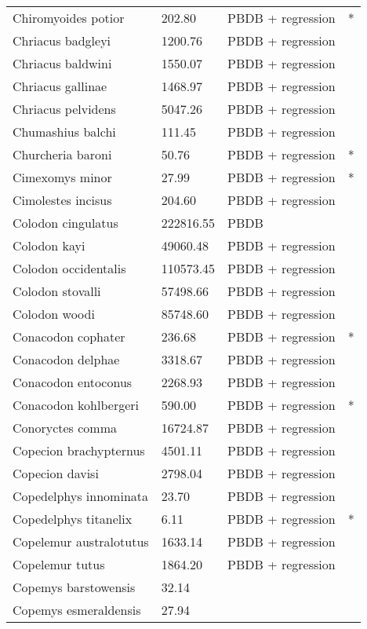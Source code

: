 \documentclass{article}
\begin{document}
\begin{center}
\begin{longtable}{p{} p{} p{} p{}}
    Chiromyoides potior & 202.80 & PBDB + regression & * \\ 
    Chriacus badgleyi & 1200.76 & PBDB + regression &  \\ 
    Chriacus baldwini & 1550.07 & PBDB + regression &  \\ 
    Chriacus gallinae & 1468.97 & PBDB + regression &  \\ 
    Chriacus pelvidens & 5047.26 & PBDB + regression &  \\ 
    Chumashius balchi & 111.45 & PBDB + regression &  \\ 
    Churcheria baroni & 50.76 & PBDB + regression & * \\ 
    Cimexomys minor & 27.99 & PBDB + regression & * \\ 
    Cimolestes incisus & 204.60 & PBDB + regression &  \\ 
    Colodon cingulatus & 222816.55 & PBDB &  \\ 
    Colodon kayi & 49060.48 & PBDB + regression &  \\ 
    Colodon occidentalis & 110573.45 & PBDB + regression &  \\ 
    Colodon stovalli & 57498.66 & PBDB + regression &  \\ 
    Colodon woodi & 85748.60 & PBDB + regression &  \\ 
    Conacodon cophater & 236.68 & PBDB + regression & * \\ 
    Conacodon delphae & 3318.67 & PBDB + regression &  \\ 
    Conacodon entoconus & 2268.93 & PBDB + regression &  \\ 
    Conacodon kohlbergeri & 590.00 & PBDB + regression & * \\ 
    Conoryctes comma & 16724.87 & PBDB + regression &  \\ 
    Copecion brachypternus & 4501.11 & PBDB + regression &  \\ 
    Copecion davisi & 2798.04 & PBDB + regression &  \\ 
    Copedelphys innominata & 23.70 & PBDB + regression &  \\ 
    Copedelphys titanelix & 6.11 & PBDB + regression & * \\ 
    Copelemur australotutus & 1633.14 & PBDB + regression &  \\ 
    Copelemur tutus & 1864.20 & PBDB + regression &  \\ 
    Copemys barstowensis & 32.14 & \cite{Tomiya2013} &  \\ 
    Copemys esmeraldensis & 27.94 & \cite{Tomiya2013} &  \\ 

\end{longtable}
\end{center}
\end{document}
